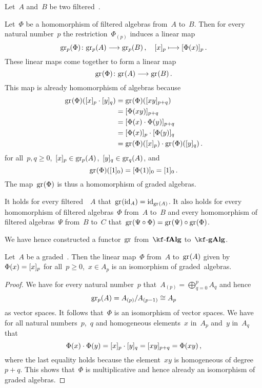 \begin{construction}
  Let~$A$ and~$B$ be two filtered~\algebra{$\kf$}.
  
  Let~$\Phi$ be a homomorphism of filtered algebras from~$A$ to~$B$.
  Then for every natural number~$p$ the restriction~$\Phi_{(p)}$ induces a linear map
  \[
    \gr[p](\Phi)
    \colon
    \gr[p](A)
    \to
    \gr[p](B) \,,
    \quad
    \fclass{x}_p
    \mapsto
    [\Phi(x)]_p  \,.
  \]
  These linear maps come together to form a linear map
  \[
    \gr(\Phi)
    \colon
    \gr(A)
    \to
    \gr(B)  \,.
  \]
  This map is already homomorphism of algebras because
  \begin{align*}
    \gr(\Phi)( \fclass{x}_p \cdot \fclass{y}_q )
    &=
    \gr(\Phi)( \fclass{xy}_{p+q} )
    \\
    &=
    [ \Phi(xy) ]_{p+q}
    \\
    &=
    [ \Phi(x) \cdot \Phi(y) ]_{p+q}
    \\
    &=
    [ \Phi(x) ]_p \cdot [ \Phi(y) ]_q
    \\
    &=
    \gr(\Phi)(\fclass{x}_p) \cdot \gr(\Phi)(\fclass{y}_q) \,.
  \end{align*}
  for all~$p, q \geq 0$,~$\fclass{x}_p \in \gr[p](A)$,~$\fclass{y}_q \in \gr[q](A)$, and
  \[
    \gr(\Phi)([1]_0)
    =
    [ \Phi(1) ]_0
    =
    [1]_0 \,.
  \]
  The map~$\gr(\Phi)$ is thus a homomorphism of graded algebras.

  It holds for every filtered~\algebra{$\kf$}~$A$ that~$\gr(\id_A) = \id_{\gr(A)}$.
  It also holds for every homomorphism of filtered algebras~$\Phi$ from~$A$ to~$B$ and every homomorphism of filtered algebras~$\Psi$ from~$B$ to~$C$ that~$\gr(\Psi \circ \Phi) = \gr(\Psi) \circ \gr(\Phi)$.
  
  We have hence constructed a functor~$\gr$ from~$\cfAlg{\kf}$ to~$\cgAlg{\kf}$.
\end{construction}


\begin{proposition}
  Let~$A$ be a graded~{\algebra{$\kf$}}.
  Then the linear map~$\Phi$ from~$A$ to~$\gr(A)$ given by~$\Phi(x) = \lbrack x\rbrack_p$ for all~$p \geq 0$,~$x \in A_p$ is an isomorphism of graded~algebras.
\end{proposition}


\begin{proof}
  We have for every natural number~$p$ that~$A_{(p)} = \bigoplus_{q=0}^p A_q$ and hence
  \[
    \gr[p](A)
    =
    A_{(p)} / A_{(p-1)}
    \cong
    A_p
  \]
  as vector spaces.
  It follows that~$\Phi$ is an isomorphism of vector spaces.
  We have for all natural numbers~$p$,~$q$ and homogeneous elements~$x$ in~$A_p$ and~$y$ in~$A_q$ that
  \[
    \Phi(x) \cdot \Phi(y)
    =
    \lbrack x\rbrack_p \cdot \lbrack y\rbrack_q
    =
    \lbrack xy\rbrack_{p+q}
    =
    \Phi(xy) \,,
  \]
  where the last equality holds because the element~$xy$ is homogeneous of degree~$p + q$.
  This shows that~$\Phi$ is multiplicative and hence already an isomorphism of graded algebras.
\end{proof}


